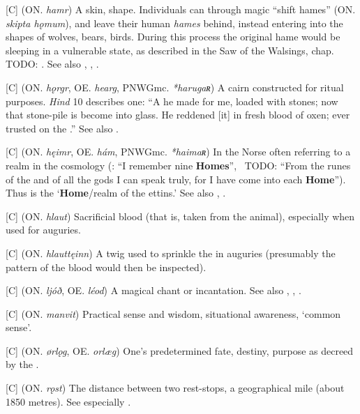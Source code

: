 \begin{itemize}
[C] (ON. \emph{hamr})
  A skin, shape. Individuals can through magic “shift hames” (ON. \emph{skipta hǫmum}), and leave their human \emph{hames} behind, instead entering into the shapes of wolves, bears, birds. During this process the original hame would be sleeping in a vulnerable state, as described in the Saw of the Walsings, chap. TODO: . See also , , .

[C] (ON. \emph{hǫrgr}, OE. \emph{hearg}, PNWGmc. \emph{*harugaʀ})
  A cairn constructed for ritual purposes. \emph{Hind} 10 describes one: “A  he made for me, loaded with stones; now that stone-pile is become into glass. He reddened [it] in fresh blood of oxen;  ever trusted on the .” See also .

[C] (ON. \emph{hęimr}, OE. \emph{hám}, PNWGmc. \emph{*haimaʀ})
  In the Norse often referring to a realm in the cosmology (: “I remember nine \textbf{Homes}”, \Vafthrudnismal\ TODO: “From the runes of the  and of all the gods I can speak truly, for I have come into each \textbf{Home}”). Thus  is the ‘\textbf{Home}/realm of the ettins.’ See also , .

[C] (ON. \emph{hlaut})
  Sacrificial blood (that is, taken from the animal), especially when used for auguries.

[C] (ON. \emph{hlauttęinn})
  A twig used to sprinkle the  in auguries (presumably the pattern of the blood would then be inspected).

[C] (ON. \emph{ljóð}, OE. \emph{léod})
  A magical chant or incantation. See also , , .

[C] (ON. \emph{manvit})
  Practical sense and wisdom, situational awareness, ‘common sense’.

[C] (ON. \emph{ørlǫg}, OE. \emph{orlæg})
  One’s predetermined fate, destiny, purpose as decreed by the .

[C] (ON. \emph{rǫst})
  The distance between two rest-stops, a geographical mile (about 1850 metres). See especially \CV.


\end{itemize}
